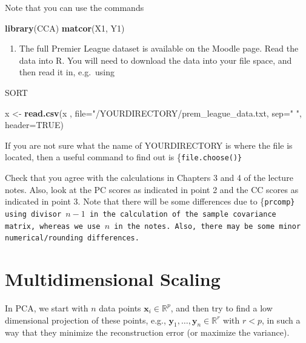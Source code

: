 \documentclass[]{book}
\newenvironment{Shaded}{\begin{snugshade}}{\end{snugshade}}
\newcommand{\DataTypeTok}[1]{\textcolor[rgb]{0.13,0.29,0.53}{#1}}
\newcommand{\KeywordTok}[1]{\textcolor[rgb]{0.13,0.29,0.53}{\textbf{#1}}}
\newcommand{\NormalTok}[1]{#1}
\newcommand{\StringTok}[1]{\textcolor[rgb]{0.31,0.60,0.02}{#1}}
\providecommand{\tightlist}{%
  \setlength{\itemsep}{0pt}\setlength{\parskip}{0pt}}
\theoremstyle{definition}
\theoremstyle{definition}
\theoremstyle{definition}
\theoremstyle{remark}
\begin{document}
Note that you can use the commands

\begin{Shaded}
\begin{Highlighting}[]
\KeywordTok{library}\NormalTok{(CCA)}
\KeywordTok{matcor}\NormalTok{(X1, Y1)}
\end{Highlighting}
\end{Shaded}

\begin{enumerate}
\def\labelenumi{\arabic{enumi}.}
\setcounter{enumi}{2}
\tightlist
\item
  The full Premier League dataset is available on the Moodle page. Read the data into R. You will need to download the data into your file space, and then
  read it in, e.g.~using
\end{enumerate}

SORT

\begin{Shaded}
\begin{Highlighting}[]
\NormalTok{x <-}\StringTok{ }\KeywordTok{read.csv}\NormalTok{(x , }\DataTypeTok{file=}\StringTok{"/YOURDIRECTORY/prem_league_data.txt, sep="} \StringTok{", header=TRUE)}
\end{Highlighting}
\end{Shaded}

If you are not sure what the name of YOURDIRECTORY is where the file is located, then a useful command to find out is \{\tt file.choose()\}

Check that you agree with the calculations in Chapters 3 and 4 of the lecture notes. Also, look at the PC scores as indicated in point 2 and the CC scores as indicated in point 3. Note that there will be some differences due to \{\tt prcomp\} using divisor \(n-1\) in the calculation of the sample covariance matrix, whereas we use \(n\) in the notes.
Also, there may be some minor numerical/rounding differences.

\hypertarget{mds}{%
\chapter{Multidimensional Scaling}\label{mds}}

In PCA, we start with \(n\) data points \(\boldsymbol x_i \in \mathbb{R}^p\), and then try to find a low dimensional projection of these points, e.g., \(\boldsymbol y_1, \ldots, \boldsymbol y_n \in \mathbb{R}^r\) with \(r<p\), in such a way that they minimize the reconstruction error (or maximize the variance).
\end{document}
